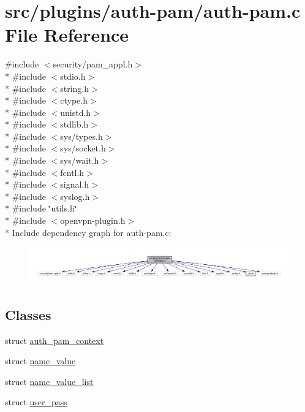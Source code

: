 \hypertarget{auth-pam_8c}{}\section{src/plugins/auth-\/pam/auth-\/pam.c File Reference}
\label{auth-pam_8c}
{\ttfamily \#include $<$security/pam\+\_\+appl.\+h$>$}\\*
{\ttfamily \#include $<$stdio.\+h$>$}\\*
{\ttfamily \#include $<$string.\+h$>$}\\*
{\ttfamily \#include $<$ctype.\+h$>$}\\*
{\ttfamily \#include $<$unistd.\+h$>$}\\*
{\ttfamily \#include $<$stdlib.\+h$>$}\\*
{\ttfamily \#include $<$sys/types.\+h$>$}\\*
{\ttfamily \#include $<$sys/socket.\+h$>$}\\*
{\ttfamily \#include $<$sys/wait.\+h$>$}\\*
{\ttfamily \#include $<$fcntl.\+h$>$}\\*
{\ttfamily \#include $<$signal.\+h$>$}\\*
{\ttfamily \#include $<$syslog.\+h$>$}\\*
{\ttfamily \#include \char`\"{}utils.\+h\char`\"{}}\\*
{\ttfamily \#include $<$openvpn-\/plugin.\+h$>$}\\*
Include dependency graph for auth-\/pam.c\+:
\nopagebreak
\begin{figure}[H]
\begin{center}
\leavevmode
\includegraphics[width=350pt]{auth-pam_8c__incl}
\end{center}
\end{figure}
\subsection*{Classes}
\begin{DoxyCompactItemize}
\item 
struct \hyperlink{structauth__pam__context}{auth\+\_\+pam\+\_\+context}
\item 
struct \hyperlink{structname__value}{name\+\_\+value}
\item 
struct \hyperlink{structname__value__list}{name\+\_\+value\+\_\+list}
\item 
struct \hyperlink{structuser__pass}{user\+\_\+pass}
\end{DoxyCompactItemize}
